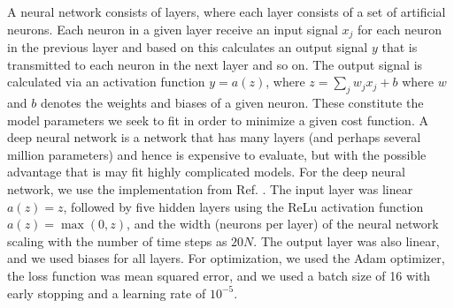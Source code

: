 \documentclass[aps, twocolumn,superscriptaddress]{revtex4-1}
\begin{document}
A neural network consists of layers, where each layer consists of a set of artificial neurons. Each neuron in a given layer receive an input signal $x_j$ for each neuron in the previous layer and based on this calculates an output signal $y$ that is transmitted to each neuron in the next layer and so on. The output signal is calculated via an activation function $y = a(z)$, where $z = \sum_j w_j x_j + b$ where $w$ and $b$ denotes the weights and biases of a given neuron. These constitute the model parameters we seek to fit in order to minimize a given cost function. A deep neural network is a network that has many layers (and perhaps several million parameters) and hence is expensive to evaluate, but with the possible advantage that is may fit highly complicated models. For the deep neural network, we use the implementation from Ref. \cite{abadi2016tensorflow}. The input layer was linear $a(z) = z$, followed by five hidden layers using the ReLu activation function $a(z) = \max(0,z)$, and the width (neurons per layer) of the neural network scaling with the number of time steps as $20N$. The output layer was also linear, and we used biases for all layers. For optimization, we used the Adam optimizer, the loss function was mean squared error, and we used a batch size of 16 with early stopping and a learning rate of $10^{-5}$.




\twocolumngrid

\end{document}
